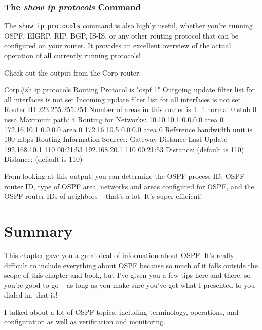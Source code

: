 \subsubsection[The \emph{show ip protocols}
Command]{\texorpdfstring{\protect\hypertarget{c18.xhtmlux5cux23c18-sec-16}{}{}The
\emph{show ip protocols} Command}{The show ip protocols Command}}

The \texttt{show\ ip\ protocols} command is also highly useful, whether
you're running OSPF, EIGRP, RIP, BGP, IS-IS, or any other routing
protocol that can be configured on your router. It provides an excellent
overview of the actual operation of all currently running protocols!

Check out the output from the Corp router:

\begin{cli}
Corp#sh ip protocols
Routing Protocol is "ospf 1"
  Outgoing update filter list for all interfaces is not set
  Incoming update filter list for all interfaces is not set
  Router ID 223.255.255.254
  Number of areas in this router is 1. 1 normal 0 stub 0 nssa
  Maximum path: 4
  Routing for Networks:
    10.10.10.1 0.0.0.0 area 0
    172.16.10.1 0.0.0.0 area 0
    172.16.10.5 0.0.0.0 area 0
 Reference bandwidth unit is 100 mbps
  Routing Information Sources:
    Gateway         Distance      Last Update
    192.168.10.1         110      00:21:53
    192.168.20.1         110      00:21:53
  Distance: (default is 110) Distance: (default is 110)
\end{cli}

From looking at this output, you can determine the OSPF process ID, OSPF
router ID, type of OSPF area, networks and areas configured for OSPF,
and the OSPF router IDs of neighbors -- that's a lot. It's
super-efficient!



\section{Summary}

This chapter gave you a great deal of information about OSPF. It's
really difficult to include everything about OSPF because so much of it
falls outside the scope of this chapter and book, but I've given you a
few tips here and there, so you're good to go -- as long as you make sure
you've got what I presented to you dialed in, that is!

I talked about a lot of OSPF topics, including terminology, operations,
and configuration as well as verification and monitoring.

